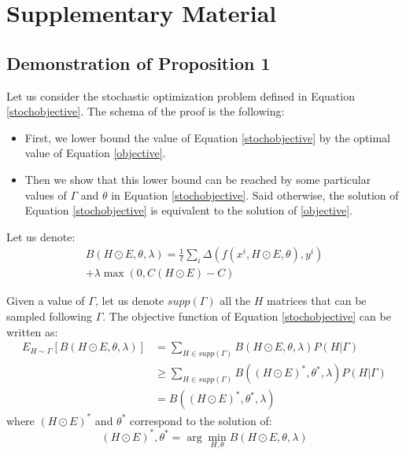 \documentclass[10pt,twocolumn,letterpaper]{article}
\begin{document}
{\small


}

\newpage
\clearpage

\thispagestyle{empty}
\section*{Supplementary Material}

\subsection*{Demonstration of Proposition 1}

Let us consider the stochastic optimization problem defined in Equation \ref{stochobjective}. The schema of the proof is the following:
\begin{itemize}
\item First, we lower bound the value of Equation \ref{stochobjective} by the optimal value of Equation \ref{objective}.
\item Then we show that this lower bound can be reached by some particular values of $\Gamma$ and $\theta$ in Equation \ref{stochobjective}. Said otherwise, the solution of Equation \ref{stochobjective} is equivalent to the solution of \ref{objective}.
\end{itemize}

Let us denote:
\begin{multline}
B(H \odot E, \theta,\lambda) = \frac{1}{\ell} \sum_i \Delta(f(x^i,H \odot E, \theta),y^i)  \\+ \lambda \max (0,C(H \odot E)-C)
\end{multline}


Given a value of $\Gamma$, let us denote $supp(\Gamma)$ all the $H$ matrices that can be sampled following $\Gamma$. The objective function of Equation \ref{stochobjective} can be written as:
\begin{equation}
\begin{aligned}
E_{H \sim \Gamma} [B(H \odot E, \theta,\lambda)] &=\sum\limits_{H \in supp(\Gamma)} B(H \odot E, \theta,\lambda) P(H|\Gamma) \\
& \geq \sum\limits_{H \in supp(\Gamma)} B((H \odot E)^*, \theta^*,\lambda) P(H|\Gamma) \\
& = B((H \odot E)^*, \theta^*,\lambda)
\end{aligned}
\label{cucu}
\end{equation}
where $(H \odot E)^*$ and $\theta^*$ correspond to the solution of:
\begin{equation}
(H \odot E)^*,\theta^* = \arg \min_{H,\theta} B(H \odot E,\theta,\lambda)
\label{eqt}
\end{equation}
\end{document}
